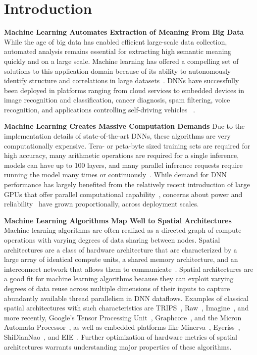 \section{Introduction}

\textbf{Machine Learning Automates Extraction of Meaning From Big Data}
While the age of big data has enabled efficient large-scale data collection, automated analysis remains essential for extracting high semantic meaning quickly and on a large scale.
Machine learning has offered a compelling set of solutions to this application domain because of its ability to autonomously identify structure and correlations in large datasets~\cite{economist2010data}.
DNNs have successfully been deployed in platforms ranging from cloud services to embedded devices in image recognition and classification, cancer diagnosis, spam filtering, voice recognition, and applications controlling self-driving vehicles ~\cite{hannun2014deep, he2016deep, hinton2012deep, krizhevsky2012imagenet, li2016persona, silver2016mastering, jafari2016extraction, fridman2017autonomous}.

\textbf{Machine Learning Creates Massive Computation Demands}
Due to the implementation details of state-of-the-art DNNs, these algorithms are very computationally expensive.
Tera- or peta-byte sized training sets are required for high accuracy, many arithmetic operations are required for a single inference, models can have up to 100 layers, and many parallel inference requests require running the model many times or continuously~\cite{dean2017nips}.
While demand for DNN performance has largely benefited from the relatively recent introduction of large GPUs that offer parallel computational capability~\cite{parloff2016why}, concerns about power and reliability~\cite{snir2014addressing} have grown proportionally, across deployment scales.

\textbf{Machine Learning Algorithms Map Well to Spatial Architectures} 
Machine learning algorithms are often realized as a directed graph of compute operations with varying degrees of data sharing between nodes.
Spatial architectures are a class of hardware architecture that are characterized by a large array of identical compute units, a shared memory architecture, and an interconnect network that allows them to communicate~\cite{parashar2013triggered, kung1982wavefront, kung1984supercomputing}.
Spatial architectures are a good fit for machine learning algorithms because they can exploit varying degrees of data reuse across multiple dimensions of their inputs to capture abundantly available thread parallelism in DNN dataflows.
Examples of classical spatial architectures with such characteristics are TRIPS~\cite{sankaralingam2003exploiting}, Raw~\cite{taylor2002raw}, Imagine~\cite{keckler2009multicore}, and more recently, Google's Tensor Processing Unit~\cite{jouppi2017datacenter}, Graphcore~\cite{knowles2017designing}, and the Micron Automata Processor~\cite{dlugosch2014efficient}, as well as embedded platforms like Minerva~\cite{reagen2016minerva}, Eyeriss~\cite{chen2016eyeriss}, ShiDianNao~\cite{du2015shidiannao}, and EIE~\cite{han2016eie}.
Further optimization of hardware metrics of spatial architectures warrants understanding major properties of these algorithms.

